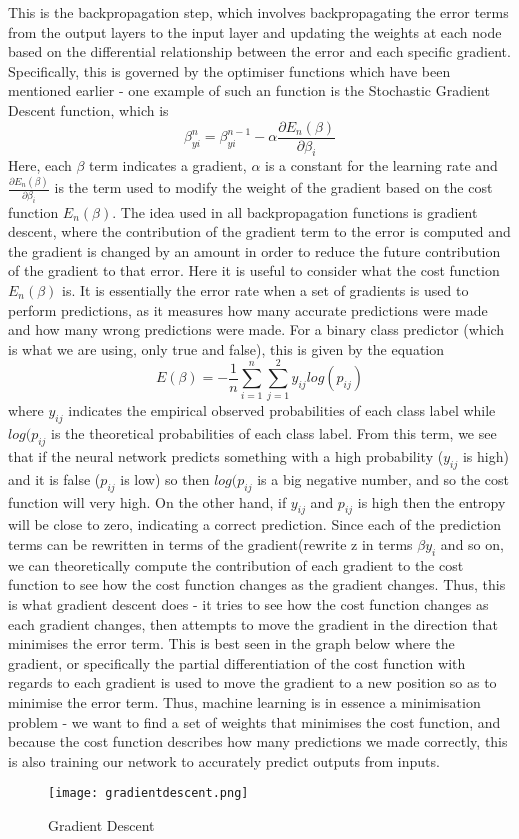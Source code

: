 \documentclass{article}
\begin{document}
This is the backpropagation step, which involves backpropagating the error terms from the output layers to the input layer and updating the weights at each node based on the differential relationship between the error and each specific gradient. Specifically, this is governed by the optimiser functions which have been mentioned earlier - one example of such an function is the Stochastic Gradient Descent function, which is 
\begin{equation}
\beta^n_{yi} = \beta^{n-1}_{yi} - \alpha \frac{\partial{E_n}(\beta)}{\partial{\beta_i}}
\end{equation}
Here, each $\beta$ term indicates a gradient, $\alpha$ is a constant for the learning rate and $\frac{\partial{E_n}(\beta)}{\partial{\beta_i}}$ is the term used to modify the weight of the gradient based on the cost function ${E_n}(\beta)$. The idea used in all backpropagation functions is gradient descent, where the contribution of the gradient term to the error is computed and the gradient is changed by an amount in order to reduce the future contribution of the gradient to that error. Here it is useful to consider what the cost function ${E_n}(\beta)$ is. It is essentially the error rate when a set of gradients is used to perform predictions, as it measures how many accurate predictions were made and how many wrong predictions were made. For a binary class predictor (which is what we are using, only true and false), this is given by the equation
\begin{equation}
E(\beta) = - \frac{1}{n}\sum_{i=1}^{n}{\sum_{j=1}^{2}y_{ij}log(p_{ij})}
\end{equation} 
where $y_{ij}$ indicates the empirical observed probabilities of each class label while $log(p_{ij}$ is the theoretical probabilities of each class label. From this term, we see that if the neural network predicts something with a high probability ($y_{ij}$ is high) and it is false ($p_{ij}$ is low) so then $log(p_{ij}$ is a big negative number, and so the cost function will very high. On the other hand, if $y_{ij}$ and $p_{ij}$ is high then the entropy will be close to zero, indicating a correct prediction. Since each of the prediction terms can be rewritten in terms of the gradient(rewrite z in terms $\beta y_i $ and so on, we can theoretically compute the contribution of each gradient to the cost function to see how the cost function changes as the gradient changes. Thus, this is what gradient descent does - it tries to see how the cost function changes as each gradient changes, then attempts to move the gradient in the direction that minimises the error term. This is best seen in the graph below  where the gradient, or specifically the partial differentiation of the cost function with regards to each gradient is used to move the gradient to a new position so as to minimise the error term. Thus, machine learning is in essence a minimisation problem - we want to find a set of weights that minimises the cost function, and because the cost function describes how many predictions we made correctly, this is also training our network to accurately predict outputs from inputs.
\begin{figure}[H]
\texttt{[image: gradientdescent.png]}
\caption{Gradient Descent}
\centering
\end{figure}
\newpage
\end{document}
